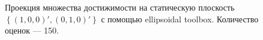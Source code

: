 \documentclass[10pt, a4paper]{article}
\begin{document}
\begin{figure}[H]
\caption{Проекция множества достижимости на статическую плоскость $\left\{(1,0,0)',(0,1,0)'\right\}$ с помощью ellipsoidal toolbox. Количество оценок --- 150.}
\end{figure}
\end{document}
